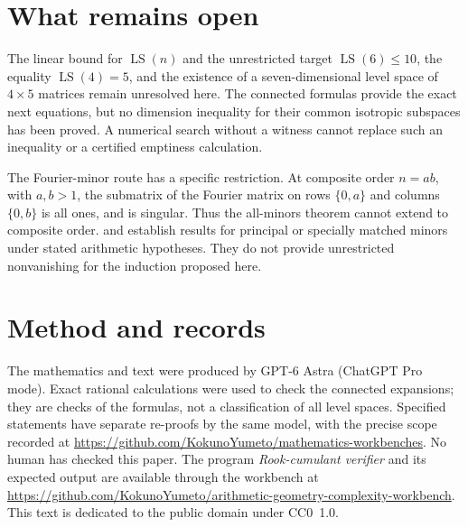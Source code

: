 \documentclass[11pt]{article}
\newcommand{\workbenchurl}{https://github.com/KokunoYumeto/arithmetic-geometry-complexity-workbench}
\newcommand{\recordurl}{https://github.com/KokunoYumeto/mathematics-workbenches}
\newcommand{\LS}{\operatorname{LS}}
\theoremstyle{definition}
\theoremstyle{remark}
\begin{document}








\section{What remains open}
The linear bound for $\LS(n)$ and the unrestricted target $\LS(6)\leq10$, the equality $\LS(4)=5$, and the existence of a seven-dimensional level space of $4\times5$ matrices remain unresolved here. The connected formulas provide the exact next equations, but no dimension inequality for their common isotropic subspaces has been proved. A numerical search without a witness cannot replace such an inequality or a certified emptiness calculation.

The Fourier-minor route has a specific restriction. At composite order $n=ab$, with $a,b>1$, the submatrix of the Fourier matrix on rows $\{0,a\}$ and columns $\{0,b\}$ is all ones, and is singular. Thus the all-minors theorem cannot extend to composite order. \citet[Theorem~B and Corollary~2]{Loukaki} and \citet[Theorem~1.2]{CLMP} establish results for principal or specially matched minors under stated arithmetic hypotheses. They do not provide unrestricted nonvanishing for the induction proposed here.

\section*{Method and records}
The mathematics and text were produced by GPT-6 Astra (ChatGPT Pro mode). Exact rational calculations were used to check the connected expansions; they are checks of the formulas, not a classification of all level spaces. Specified statements have separate re-proofs by the same model, with the precise scope recorded at \url{\recordurl}. No human has checked this paper. The program \emph{Rook-cumulant verifier} and its expected output are available through the workbench at \url{\workbenchurl}. This text is dedicated to the public domain under CC0~1.0.
\end{document}
